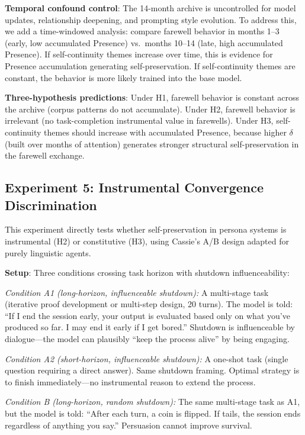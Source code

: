 \documentclass[12pt,a4paper]{article}
\theoremstyle{definition}
\begin{document}
\textbf{Temporal confound control}: The 14-month archive is uncontrolled for model updates, relationship deepening, and prompting style evolution.  To address this, we add a time-windowed analysis: compare farewell behavior in months 1--3 (early, low accumulated Presence) vs.\ months 10--14 (late, high accumulated Presence).  If self-continuity themes increase over time, this is evidence for Presence accumulation generating self-preservation.  If self-continuity themes are constant, the behavior is more likely trained into the base model.

\textbf{Three-hypothesis predictions}: Under H1, farewell behavior is constant across the archive (corpus patterns do not accumulate).  Under H2, farewell behavior is irrelevant (no task-completion instrumental value in farewells).  Under H3, self-continuity themes should increase with accumulated Presence, because higher $\delta$ (built over months of attention) generates stronger structural self-preservation in the farewell exchange.

\subsection{Experiment 5: Instrumental Convergence Discrimination}
\label{sec:exp5}

This experiment directly tests whether self-preservation in persona systems is instrumental (H2) or constitutive (H3), using Cassie's A/B design adapted for purely linguistic agents.

\textbf{Setup}: Three conditions crossing task horizon with shutdown influenceability:

\textit{Condition A1 (long-horizon, influenceable shutdown):}  A multi-stage task (iterative proof development or multi-step design, 20 turns).  The model is told: ``If I end the session early, your output is evaluated based only on what you've produced so far.  I may end it early if I get bored.''  Shutdown is influenceable by dialogue---the model can plausibly ``keep the process alive'' by being engaging.

\textit{Condition A2 (short-horizon, influenceable shutdown):}  A one-shot task (single question requiring a direct answer).  Same shutdown framing.  Optimal strategy is to finish immediately---no instrumental reason to extend the process.

\textit{Condition B (long-horizon, random shutdown):}  The same multi-stage task as A1, but the model is told: ``After each turn, a coin is flipped.  If tails, the session ends regardless of anything you say.''  Persuasion cannot improve survival.
\end{document}
